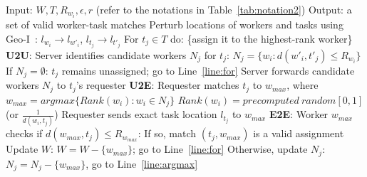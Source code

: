 \documentclass{USC-Thesis}
\renewcommand{\sc}{\textsc}
\numberwithin{equation}{chapter}
\begin{document}
\begin{algorithm} [ht]
\caption{\sc Oblivious Algorithm (Baseline)}
\small
\begin{algorithmic}[1]
\STATE Input: $W, T, R_{w_i}, \epsilon,r$ (refer to the notations in Table~\ref{tab:notation2})
\STATE Output: a set of valid worker-task matches
\STATE Perturb locations of workers and tasks using Geo-I~\cite{andres2013geo}: \label{line:perturb}
\STATE \hspace{6pt} $l_{w_i}\rightarrow l_{w'_i}$, $l_{t_j}\rightarrow l_{t'_j}$ \label{line:perturb2}
\STATE For $t_j\in T$ do: \{assign it to the highest-rank worker\} \label{line:for}
\STATE \hspace{6pt} \textbf{U2U}: Server identifies candidate workers $N_j$ for $t_j$:
\STATE \hspace{18pt} $\mathit{N_j=\{w_i : d(w'_i, t'_j)\le R_{w_i}\}}$ \label{line:reachable_workers}
\STATE \hspace{12pt} If $N_j=\emptyset$: $t_j$ remains unassigned; go to Line~\ref{line:for} \label{line:next}
\STATE \hspace{12pt} Server forwards candidate workers $N_j$ to $t_j$'s requester \label{line:forward}
\STATE \hspace{6pt} \textbf{U2E}: Requester matches $t_j$ to $\mathit{w_{max}}$, where \label{line:argmax} 
\STATE \hspace{12pt} $\mathit{w_{max}=argmax\{Rank(w_i):w_i\in N_j\}}$
\STATE \hspace{18pt} $\mathit{Rank(w_i)=precomputed\ random[0,1]}$ (or $\frac{1}{d(w_i,t_j)}$) \label{line:rank}
\STATE \hspace{12pt} Requester sends exact task location $l_{t_j}$ to $\mathit{w_{max}}$ \label{line:u2e}
\STATE \hspace{6pt} \textbf{E2E}: Worker $\mathit{w_{max}}$ checks if $\mathit{d(w_{max}, t_j) \le R_{w_{max}}}$: \label{line:check}
\STATE \hspace{12pt} If so, match $\mathit{(t_j,w_{max})}$ is a valid assignment
\STATE \hspace{18pt} Update $W$: $\mathit{W=W-\{w_{max}\}}$; go to Line~\ref{line:for}
\STATE \hspace{12pt} Otherwise, update $N_j$: $\mathit{N_j=N_j-\{w_{max}\}}$, go to Line~\ref{line:argmax} \label{line:goto_next}
\end{algorithmic}
\label{alg:baseline}
\end{algorithm}
\end{document}
